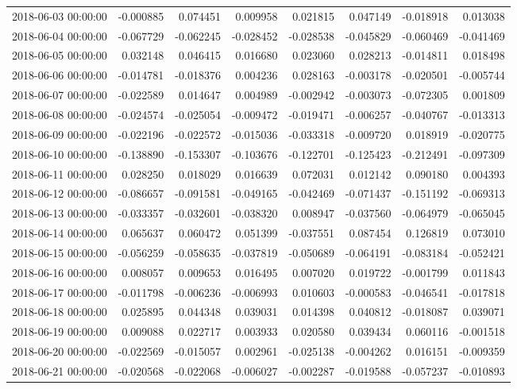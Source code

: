 \begin{tabular}{lrrrrrrr}
2018-06-03 00:00:00 & -0.000885 & 0.074451 & 0.009958 & 0.021815 & 0.047149 & -0.018918 & 0.013038 \\
2018-06-04 00:00:00 & -0.067729 & -0.062245 & -0.028452 & -0.028538 & -0.045829 & -0.060469 & -0.041469 \\
2018-06-05 00:00:00 & 0.032148 & 0.046415 & 0.016680 & 0.023060 & 0.028213 & -0.014811 & 0.018498 \\
2018-06-06 00:00:00 & -0.014781 & -0.018376 & 0.004236 & 0.028163 & -0.003178 & -0.020501 & -0.005744 \\
2018-06-07 00:00:00 & -0.022589 & 0.014647 & 0.004989 & -0.002942 & -0.003073 & -0.072305 & 0.001809 \\
2018-06-08 00:00:00 & -0.024574 & -0.025054 & -0.009472 & -0.019471 & -0.006257 & -0.040767 & -0.013313 \\
2018-06-09 00:00:00 & -0.022196 & -0.022572 & -0.015036 & -0.033318 & -0.009720 & 0.018919 & -0.020775 \\
2018-06-10 00:00:00 & -0.138890 & -0.153307 & -0.103676 & -0.122701 & -0.125423 & -0.212491 & -0.097309 \\
2018-06-11 00:00:00 & 0.028250 & 0.018029 & 0.016639 & 0.072031 & 0.012142 & 0.090180 & 0.004393 \\
2018-06-12 00:00:00 & -0.086657 & -0.091581 & -0.049165 & -0.042469 & -0.071437 & -0.151192 & -0.069313 \\
2018-06-13 00:00:00 & -0.033357 & -0.032601 & -0.038320 & 0.008947 & -0.037560 & -0.064979 & -0.065045 \\
2018-06-14 00:00:00 & 0.065637 & 0.060472 & 0.051399 & -0.037551 & 0.087454 & 0.126819 & 0.073010 \\
2018-06-15 00:00:00 & -0.056259 & -0.058635 & -0.037819 & -0.050689 & -0.064191 & -0.083184 & -0.052421 \\
2018-06-16 00:00:00 & 0.008057 & 0.009653 & 0.016495 & 0.007020 & 0.019722 & -0.001799 & 0.011843 \\
2018-06-17 00:00:00 & -0.011798 & -0.006236 & -0.006993 & 0.010603 & -0.000583 & -0.046541 & -0.017818 \\
2018-06-18 00:00:00 & 0.025895 & 0.044348 & 0.039031 & 0.014398 & 0.040812 & -0.018087 & 0.039071 \\
2018-06-19 00:00:00 & 0.009088 & 0.022717 & 0.003933 & 0.020580 & 0.039434 & 0.060116 & -0.001518 \\
2018-06-20 00:00:00 & -0.022569 & -0.015057 & 0.002961 & -0.025138 & -0.004262 & 0.016151 & -0.009359 \\
2018-06-21 00:00:00 & -0.020568 & -0.022068 & -0.006027 & -0.002287 & -0.019588 & -0.057237 & -0.010893 \\

\end{tabular}
